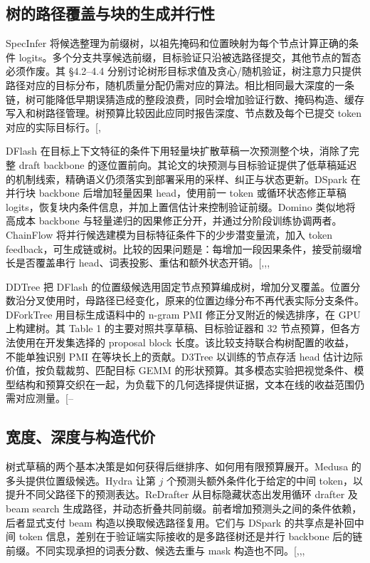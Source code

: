 \documentclass[
  a4paper,
  UTF8,
  fontset=none,
  zihao=5]{ctexart}
\begin{document}
\subsection{树的路径覆盖与块的生成并行性}\label{draft-geometry}

SpecInfer
将候选整理为前缀树，以祖先掩码和位置映射为每个节点计算正确的条件
logits。多个分支共享候选前缀，目标验证只沿被选路径提交，其他节点的暂态必须作废。其
§4.2--4.4
分别讨论树形目标求值及贪心/随机验证，树注意力只提供路径对应的目标分布，随机质量分配仍需对应的算法。相比相同最大深度的一条链，树可能降低早期误猜造成的整段浪费，同时会增加验证行数、掩码构造、缓存写入和树路径管理。树预算比较因此应同时报告深度、节点数及每个已提交
token
对应的实际目标行。{[},\citeproc{ref-eagle2}{38}{]}

DFlash
在目标上下文特征的条件下用轻量块扩散草稿一次预测整个块，消除了完整 draft
backbone
的逐位置前向。其论文的块预测与目标验证提供了低草稿延迟的机制线索，精确语义仍须落实到部署采用的采样、纠正与状态更新。DSpark
在并行块 backbone 后增加轻量因果 head，使用前一 token 或循环状态修正草稿
logits，恢复块内条件信息，并加上置信估计来控制验证前缀。Domino
类似地将高成本 backbone
与轻量递归的因果修正分开，并通过分阶段训练协调两者。ChainFlow
将并行候选建模为目标特征条件下的少步潜变量流，加入 token
feedback，可生成链或树。比较的因果问题是：每增加一段因果条件，接受前缀增长是否覆盖串行
head、词表投影、重估和额外状态开销。{[},,,\citeproc{ref-chainflow}{46}{]}

DDTree 把 DFlash
的位置级候选用固定节点预算编成树，增加分叉覆盖。位置分数沿分叉使用时，母路径已经变化，原来的位置边缘分布不再代表实际分支条件。DForkTree
用目标生成语料中的 n-gram PMI 修正分叉附近的候选排序，在 GPU
上构建树。其 Table 1 的主要对照共享草稿、目标验证器和 32
节点预算，但各方法使用在开发集选择的 proposal block
长度。该比较支持联合构树配置的收益，不能单独识别 PMI
在等块长上的贡献。D3Tree 以训练的节点存活 head
估计边际价值，按负载裁剪、匹配目标 GEMM
的形状预算。其多模态实验把视觉条件、模型结构和预算交织在一起，为负载下的几何选择提供证据，文本在线的收益范围仍需对应测量。{[}--\citeproc{ref-d3tree}{49}{]}

\subsection{宽度、深度与构造代价}\label{tree-construction}

树式草稿的两个基本决策是如何获得后继排序、如何用有限预算展开。Medusa
的多头提供位置级候选。Hydra 让第 \(j\) 个预测头额外条件化于给定的中间
token，以提升不同父路径下的预测表达。ReDrafter 从目标隐藏状态出发用循环
drafter 及 beam search
生成路径，并动态折叠共同前缀。前者增加预测头之间的条件依赖，后者显式支付
beam 构造以换取候选路径复用。它们与 DSpark 的共享点是补回中间 token
信息，差别在于验证端实际接收的是多路径树还是并行 backbone
后的链前缀。不同实现承担的词表分数、候选去重与 mask
构造也不同。{[},,,\citeproc{ref-redrafter}{51}{]}
\end{document}
